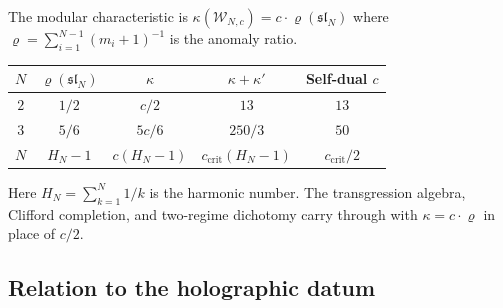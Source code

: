 \begin{remark}
\label{rem:g9-wn-sums}
The modular characteristic is $\kappa(\mathcal{W}_{N,c}) = c \cdot
\varrho(\mathfrak{sl}_N)$ where $\varrho = \sum_{i=1}^{N-1}(m_i+1)^{-1}$
is the anomaly ratio.
\begin{center}
\renewcommand{\arraystretch}{1.3}
\begin{tabular}{ccccc}
\toprule
$N$ & $\varrho(\mathfrak{sl}_N)$ & $\kappa$ &
$\kappa + \kappa'$ & Self-dual $c$ \\
\midrule
$2$ & $1/2$ & $c/2$ & $13$ & $13$ \\
$3$ & $5/6$ & $5c/6$ & $250/3$ & $50$ \\
$N$ & $H_N - 1$ & $c(H_N - 1)$ &
$c_{\mathrm{crit}}(H_N-1)$ & $c_{\mathrm{crit}}/2$ \\
\bottomrule
\end{tabular}
\end{center}
Here $H_N = \sum_{k=1}^N 1/k$ is the harmonic number. The
transgression algebra, Clifford completion, and two-regime dichotomy
carry through with $\kappa = c \cdot \varrho$ in place of $c/2$.
\end{remark}

%
%

\subsection{Relation to the holographic datum}
\label{subsec:holographic-relation}

